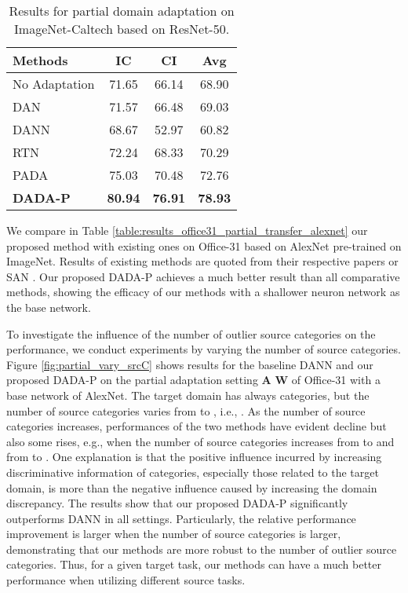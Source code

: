 \documentclass[letterpaper]{article} \usepackage{aaai20}  \usepackage{times}  \usepackage{helvet} \usepackage{courier}  \usepackage[hyphens]{url}  \usepackage{graphicx} \urlstyle{rm} \def\UrlFont{\rm}  \usepackage{graphicx}  \frenchspacing  \setlength{\pdfpagewidth}{8.5in}  \setlength{\pdfpageheight}{11in}
\begin{document}
\begin{table}[t]
	\begin{center}
		\caption{Results for partial domain adaptation on ImageNet-Caltech based on ResNet-50.}
		\label{table:results_imagenet_caltech_partial_transfer}
		\begin{tabular}{lccc}
			\hline
			Methods  & IC & CI & Avg  \\
			\hline
			No Adaptation \cite{resnet} & 71.65 & 66.14 & 68.90 \\
			
			DAN \cite{dan}              & 71.57 & 66.48 & 69.03  \\
			
			DANN \cite{dann}            & 68.67 & 52.97 & 60.82  \\
			
			RTN \cite{rtn}              & 72.24 & 68.33 & 70.29  \\  
			
			PADA \cite{pada}            & 75.03 & 70.48 & 72.76  \\
			\hline
			\textbf{DADA-P}           & \textbf{80.94} & \textbf{76.91} & \textbf{78.93} \\
			\hline
		\end{tabular}
	\end{center}
\end{table}

We compare in Table \ref{table:results_office31_partial_transfer_alexnet} our proposed method with existing ones on Office-31 based on AlexNet \cite{alexnet} pre-trained on ImageNet. Results of existing methods are quoted from their respective papers or SAN \cite{san}. Our proposed DADA-P achieves a much better result than all comparative methods, showing the efficacy of our methods with a shallower neuron network as the base network.

To investigate the influence of the number of outlier source categories on the performance, we conduct experiments by varying the number of source categories. Figure \ref{fig:partial_vary_srcC} shows results for the baseline DANN \cite{dann} and our proposed DADA-P on the partial adaptation setting \textbf{A}  \textbf{W} of Office-31 with a base network of AlexNet. The target domain has always  categories, but the number of source categories varies from  to , i.e., . As the number of source categories increases, performances of the two methods have evident decline but also some rises, e.g., when the number of source categories increases from  to  and from  to . One explanation is that the positive influence incurred by increasing discriminative information of categories, especially those related to the target domain, is more than the negative influence caused by increasing the domain discrepancy. The results show that our proposed DADA-P significantly outperforms DANN in all settings. Particularly, the relative performance improvement is larger when the number of source categories is larger, demonstrating that our methods are more robust to the number of outlier source categories. Thus, for a given target task, our methods can have a much better performance when utilizing different source tasks.
\end{document}
